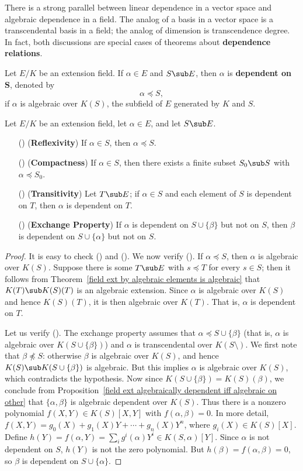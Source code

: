 There is a strong parallel between linear dependence in a vector space and algebraic dependence in a field. The analog of a basis in a vector space is a transcendental basis in a field; the analog of dimension is transcendence degree. In fact, both discussions are special cases of theorems about \textbf{dependence relations}.\par
Let $E/K$ be an extension field. If $\alpha\in E$ and $S\sub E$, then $\alpha$ is \textbf{dependent on $\bm{S}$}, denoted by
\[\alpha\preceq S,\]
if $\alpha$ is algebraic over $K(S)$, the subfield of $E$ generated by $K$ and $S$.
\begin{proposition}\label{field algebraic dependence prop}
Let $E/K$ be an extension field, let $\alpha\in E$, and let $S\sub E$.
\begin{itemize}
\item[(\rmnum{1})] (\textbf{Reflexivity}) If $\alpha\in S$, then $\alpha\preceq S$. 
\item[(\rmnum{2})] (\textbf{Compactness}) If $\alpha\in S$, then there exists a finite subset $S_0\sub S$ with $\alpha\preceq S_0$.
\item[(\rmnum{3})] (\textbf{Transitivity}) Let $T\sub E$; if $\alpha\in S$ and each element of $S$ is dependent on $T$, then $\alpha$ is dependent on $T$.
\item[(\rmnum{4})] (\textbf{Exchange Property}) If $\alpha$ is dependent on $S\cup\{\beta\}$ but not on $S$, then $\beta$ is dependent on $S\cup\{\alpha\}$ but not on $S$.
\end{itemize}
\end{proposition}
\begin{proof}
It is easy to check () and (). We now verify (). If $\alpha\preceq S$, then $\alpha$ is algebraic over $K(S)$. Suppose there is some $T\sub E$ with $s\preceq T$ for every $s\in S$; then it follows from Theorem~\ref{field ext by algebraic elements is algebraic} that $K(T)\sub K(S)(T)$ is an algebraic extension. Since $\alpha$ is algebraic over $K(S)$ and hence $K(S)(T)$, it is then algebraic over $K(T)$. That is, $\alpha$ is dependent on $T$.\par
Let us verify (). The exchange property assumes that $\alpha\preceq S\cup\{\beta\}$ (that is, $\alpha$ is algebraic over $K(S\cup\{\beta\})$) and $\alpha$ is transcendental over $K(S\setminus)$. We first note that $\beta\not\preceq S$: otherwise $\beta$ is algebraic over $K(S)$, and hence $K(S)\sub K(S\cup\{\beta\})$ is algebraic. But this implies $\alpha$ is algebraic over $K(S)$, which contradicts the hypothesis. Now since $K(S\cup\{\beta\})=K(S)(\beta)$, we conclude from Proposition~\ref{field ext algebraically dependent iff algebraic on other} that $\{\alpha,\beta\}$ is algebraic dependent over $K(S)$. Thus there is a nonzero polynomial $f(X,Y)\in K(S)[X,Y]$ with $f(\alpha,\beta)=0$. In more detail, $f(X,Y)=g_0(X)+g_1(X)Y+\cdots+g_n(X)Y^n$, where $g_i(X)\in K(S)[X]$. Define $h(Y)=f(\alpha,Y)=\sum_ig^i(\alpha)Y^i\in K(S,\alpha)[Y]$. Since $\alpha$ is not dependent on $S$, $h(Y)$ is not the zero polynomial. But $h(\beta)=f(\alpha,\beta)=0$, so $\beta$ is dependent on $S\cup\{\alpha\}$.
\end{proof}

